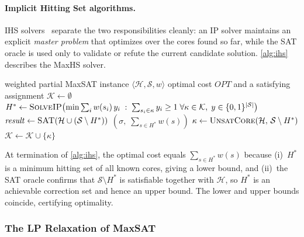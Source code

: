 \paragraph{Implicit Hitting Set algorithms.}
IHS solvers~\citep{davies2011solving,davies2013exploiting} separate the two responsibilities cleanly: an IP solver maintains an explicit \emph{master problem} that optimizes over the cores found so far, while the SAT oracle is used only to validate or refute the current candidate solution. \cref{alg:ihs} describes the MaxHS solver.

\begin{algorithm}[t]
\caption{Implicit Hitting Set MaxSAT (MaxHS)}
\label{alg:ihs}
\begin{algorithmic}[1]
\Require weighted partial MaxSAT instance $\langle \mathcal{H}, \mathcal{S}, w \rangle$
\Ensure optimal cost $\mathit{OPT}$ and a satisfying assignment
\State $\mathcal{K} \leftarrow \emptyset$ 
\Loop
    \State $H^* \leftarrow \textsc{SolveIP}\!\left(\min \textstyle\sum_{i} w(s_i)\,y_i \;:\; \sum_{s_i \in \kappa} y_i \geq 1\;\forall \kappa \in \mathcal{K},\; y \in \{0,1\}^{|\mathcal{S}|}\right)$
    \State $\mathit{result} \leftarrow \textsc{SAT}\!\left(\mathcal{H} \cup \left(\mathcal{S} \setminus H^*\right)\right)$
        \State \Return $\!\left(\sigma,\; \textstyle\sum_{s \in H^*} w(s)\right)$
    \EndIf
    \State $\kappa \leftarrow \textsc{UnsatCore}\!\left(\mathcal{H},\, \mathcal{S} \setminus H^*\right)$
    \State $\mathcal{K} \leftarrow \mathcal{K} \cup \{\kappa\}$
\EndLoop
\end{algorithmic}
\end{algorithm}

At termination of \cref{alg:ihs}, the optimal cost equals $\sum_{s \in H^*} w(s)$ because (i)~$H^*$ is a minimum hitting set of all known cores, giving a lower bound, and (ii)~the SAT oracle confirms that $\mathcal{S} \setminus H^*$ is satisfiable together with $\mathcal{H}$, so $H^*$ is an achievable correction set and hence an upper bound. The lower and upper bounds coincide, certifying optimality.

\subsubsection{The LP Relaxation of MaxSAT}

